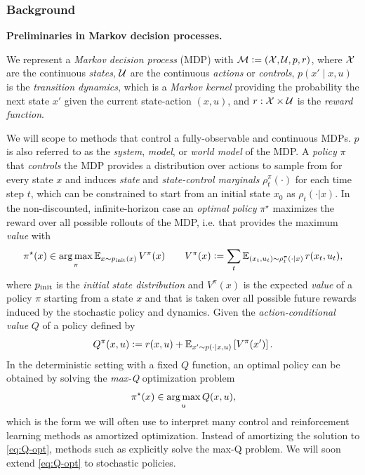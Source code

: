 \documentclass[twoside,11pt]{article}
\newcommand{\ie}{i.e.\xspace}
\begin{document}
\subsubsection{Background}
\textbf{Preliminaries in Markov decision processes.}
\begin{definition}
  We represent a \emph{Markov decision process} (MDP) with
  ${\mathcal{M}}\vcentcolon=({\mathcal{X}}, {\mathcal{U}}, p, r)$,
  where ${\mathcal{X}}$ are the continuous \emph{states},
  ${\mathcal{U}}$ are the continuous \emph{actions} or \emph{controls},
  $p(x' \mid x, u)$ is the \emph{transition dynamics},
  which is a \emph{Markov kernel} providing
  the probability the next state $x'$
  given the current state-action $(x, u)$,
  and $r: {\mathcal{X}}\times{\mathcal{U}}$ is the \emph{reward function}.
\end{definition}
We will scope to methods that control a
fully-observable and continuous MDPs.
$p$ is also referred to as the \emph{system},
\emph{model}, or \emph{world model} of the MDP.
A \emph{policy} $\pi$ that \emph{controls}
the MDP provides a distribution over actions to sample from
for every state $x$ and induces \emph{state} and
\emph{state-control marginals} $\rho_t^\pi(\cdot)$ for each
time step $t$, which can be constrained to start from an initial
state $x_0$ as $\rho_t(\cdot|x)$.
In the non-discounted, infinite-horizon case
an \emph{optimal policy} $\pi^\star$ maximizes the reward over
all possible rollouts of the MDP, \ie that
provides the maximum \emph{value} with
\begin{equation}
  \pi^\star(x)\in \operatorname*{arg\,max}_\pi \operatorname{\mathbb{E}}_{x\sim p_{\rm init}(x)} V^\pi(x)
  \qquad
  V^\pi(x)\vcentcolon= \sum_t \operatorname{\mathbb{E}}_{(x_t, u_t)\sim\rho_t^\pi(\cdot\mid x)} r(x_t, u_t),
  \label{eq:pistar}
\end{equation}
where $p_{\rm init}$ is the \emph{initial state distribution}
and $V^\pi(x)$ is the expected \emph{value} of a policy $\pi$
starting from a state $x$ and that is taken over all possible
future rewards induced by the stochastic policy and dynamics.
Given the \emph{action-conditional value} $Q$ of a policy
defined by
\begin{equation}
  Q^\pi(x, u)\vcentcolon= r(x, u) + \operatorname{\mathbb{E}}_{x'\sim p(\cdot|x,u)}\left[V^\pi(x')\right].
  \label{eq:Q}
\end{equation}
In the deterministic setting with a fixed $Q$ function,
an optimal policy can be obtained by solving the
\emph{max-Q} optimization problem
\begin{equation}
  \pi^\star(x) \in \operatorname*{arg\,max}_u Q(x, u),
  \label{eq:Q-opt}
\end{equation}
which is the form we will often use to interpret many
control and reinforcement learning methods
as amortized optimization.
Instead of amortizing the solution to \cref{eq:Q-opt},
methods such as \citet{lowrey2018plan,ryu2019caql}
explicitly solve the max-Q problem.
We will soon extend \cref{eq:Q-opt} to stochastic policies.
\end{document}
